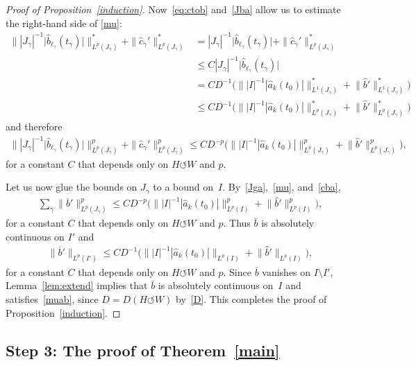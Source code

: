 \documentclass[pdftex]{sigma}
\numberwithin{equation}{section}
\def\ga{\gamma}
\def\ol{\overline}
\def\we{\hat}
\def\acts{\circlearrowleft}
\begin{document}
\begin{proof}[Proof of Proposition~\ref{induction}]
{}


Now~\eqref{eq:ctob} and~\eqref{Jba} allow us to estimate the right-hand side of
\eqref{mu}:
\begin{align*}
 \big\||J_\ga|^{-1} \big|\hat b_{\ell_\ga}(t_\ga)\big| \big\|^*_{L^p (J_\ga)}
 + \|\hat c_{\ga}'\|^*_{L^p (J_\ga)}
 &= |J_\ga|^{-1} \big|\hat b_{\ell_\ga}(t_\ga)\big| +
 \|\hat c_{\ga}'\|^*_{L^p (J_\ga)}
 \\
 &\le C |J_\ga|^{-1} \big|\hat b_{\ell_\ga}(t_\ga)\big|
 \\
 &= C D^{-1} \Big( \big\| |I|^{-1} {|\hat a_k(t_0)|} \big\|^*_{L^1 (J_\ga)}
 + \big\|\hat b'\big\|^*_{L^1 (J_\ga)}\Big)
 \\
 &\le C D^{-1} \Big( \big\| |I|^{-1} {|\hat a_k(t_0)|} \big\|^*_{L^p (J_\ga)}
 + \big\|\hat b'\big\|^*_{L^p (J_\ga)}\Big)
\end{align*}
and therefore
\begin{gather}
\big \||J_\ga|^{-1} \big|\hat b_{\ell_\ga}(t_\ga)\big|\big \|^p_{L^p (J_\ga)}
 + \|\hat c_{\ga}'\|^p_{L^p (J_\ga)}
 \le C D^{-p} \Big( \big\| |I|^{-1} {|\hat a_k(t_0)|} \big\|^p_{L^p (J_\ga)}
 + \big\|\hat b'\big\|^p_{L^p (J_\ga)}\Big), \label{cba}
\end{gather}
for a constant $C$ that depends only on $H \acts W$ and $p$.




Let us now glue the bounds on $J_\ga$ to a bound on~$I$. By~\eqref{Jga},~\eqref{mu}, and~\eqref{cba},
\begin{gather*} %
 \sum_\ga \big\|\ol b'\big\|^p_{L^p(J_\ga)}
 \le C D^{-p} \Big( \big\| |I|^{-1} {|\hat a_k(t_0)|} \big\|^p_{L^p (I)}
 + \big\|\we b'\big\|^p_{L^p (I)}\Big),
\end{gather*}
for a constant $C$ that depends only on $H \acts W$ and $p$.
Thus $\ol b$ is absolutely continuous on $I'$
and
\begin{gather*}
 \big\|\ol b'\big\|_{L^p(I')}
 \le C D^{-1} \Big( \big\| |I|^{-1} {|\we a_k(t_0)|} \big\|_{L^p (I)}
 + \big\|\we b'\big\|_{L^p (I)}\Big),
\end{gather*}
for a constant $C$ that depends only on $H \acts W$ and $p$.
Since $\ol b$ vanishes on $I \setminus I'$,
Lemma~\ref{lem:extend} implies that $\ol b$ is absolutely continuous on~$I$ and
satisfies~\eqref{muab}, since $D = D(H \acts W)$ by~\eqref{D}.
This completes the proof of Proposition~\ref{induction}.
\end{proof}

\subsection*{Step 3: The proof of Theorem~\ref{main}}
\end{document}
